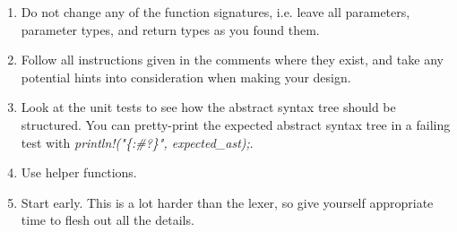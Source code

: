 \documentclass[
	12pt, %
]{fphw}
\begin{document}
\begin{problem}
    \begin{enumerate}
        \item Do not change any of the function signatures, i.e. leave all parameters, parameter types, and return types as you found them.
        \item Follow all instructions given in the comments where they exist, and take any potential hints into consideration when making your design.
        \item Look at the unit tests to see how the abstract syntax tree should be structured. You can pretty-print the expected abstract syntax tree in a failing test with \textit{println!("\{:\#?\}", expected\_ast);}.
        \item Use helper functions.
        \item Start early. This is a lot harder than the lexer, so give yourself appropriate time to flesh out all the details.
        
    \end{enumerate}
\end{problem}

\pagebreak
\end{document}
